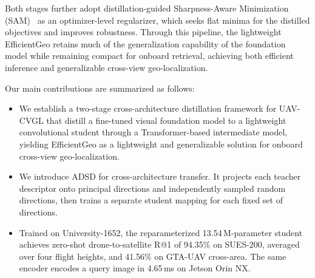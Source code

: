  Both stages further adopt distillation-guided Sharpness-Aware Minimization (SAM)~\cite{foret2021sam}  as an optimizer-level regularizer, which seeks flat minima for the distilled objectives and improves robustness. Through this pipeline, the lightweight EfficientGeo retains much of the generalization capability of the foundation model while remaining compact for onboard retrieval, achieving both efficient inference and generalizable cross-view geo-localization.

Our main contributions are summarized as follows:
\begin{itemize}
  \item We establish a two-stage cross-architecture distillation framework for UAV-CVGL that distill a fine-tuned visual foundation model to a lightweight convolutional student through a Transformer-based intermediate model, yielding EfficientGeo as a lightweight and generalizable solution for onboard cross-view geo-localization.
  \item We introduce ADSD for cross-architecture transfer. It projects each teacher descriptor onto principal directions and independently sampled random directions, then trains a separate student mapping for each fixed set of directions.
  \item Trained on University-1652, the reparameterized 13.54\,M-parameter student achieves zero-shot drone-to-satellite R@1 of 94.35\% on SUES-200, averaged over four flight heights, and 41.56\% on GTA-UAV cross-area. The same encoder encodes a query image in 4.65\,ms on Jetson Orin NX.

\end{itemize}

